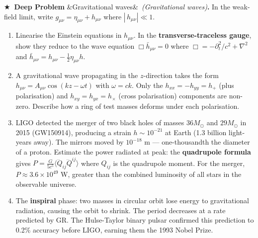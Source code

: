 \documentclass[12pt,a4paper]{article}
\newcounter{problem}
\newcounter{deepproblem}
\newenvironment{deepproblem}[1][]{\refstepcounter{deepproblem}\par\vspace{6pt}\noindent\textbf{\color{NavyBlue}$\bigstar$\ Deep Problem \thedeepproblem}\ifx&#1&\else\ \textit{(#1)}\fi\textbf{.}\enskip}{\par\vspace{4pt}}
\begin{document}
\begin{deepproblem}[Gravitational waves]
In the weak-field limit, write $g_{\mu\nu}=\eta_{\mu\nu}+h_{\mu\nu}$ where $|\,h_{\mu\nu}|\ll 1$.
\begin{enumerate}[label=(\alph*)]
  \item Linearise the Einstein equations in $h_{\mu\nu}$. In the \textbf{transverse-traceless gauge}, show they reduce to the wave equation $\Box\bar h_{\mu\nu}=0$ where $\Box=-\partial_t^2/c^2+\nabla^2$ and $\bar h_{\mu\nu}=h_{\mu\nu}-\frac{1}{2}\eta_{\mu\nu}h$.
  \item A gravitational wave propagating in the $z$-direction takes the form $h_{\mu\nu}=A_{\mu\nu}\cos(kz-\omega t)$ with $\omega=ck$. Only the $h_{xx}=-h_{yy}=h_+$ (plus polarisation) and $h_{xy}=h_{yx}=h_\times$ (cross polarisation) components are non-zero. Describe how a ring of test masses deforms under each polarisation.
  \item LIGO detected the merger of two black holes of masses $36M_\odot$ and $29M_\odot$ in 2015 (GW150914), producing a strain $h\sim 10^{-21}$ at Earth (1.3 billion light-years away). The mirrors moved by $10^{-18}$ m --- one-thousandth the diameter of a proton. Estimate the power radiated at peak: the \textbf{quadrupole formula} gives $P = \frac{G}{5c^5}\langle\dddot{Q}_{ij}\dddot{Q}^{ij}\rangle$ where $Q_{ij}$ is the quadrupole moment. For the merger, $P\approx 3.6\times 10^{49}$ W, greater than the combined luminosity of all stars in the observable universe.
  \item The \textbf{inspiral} phase: two masses in circular orbit lose energy to gravitational radiation, causing the orbit to shrink. The period decreases at a rate predicted by GR. The Hulse-Taylor binary pulsar confirmed this prediction to 0.2\% accuracy before LIGO, earning them the 1993 Nobel Prize.
\end{enumerate}
\end{deepproblem}
\end{document}
